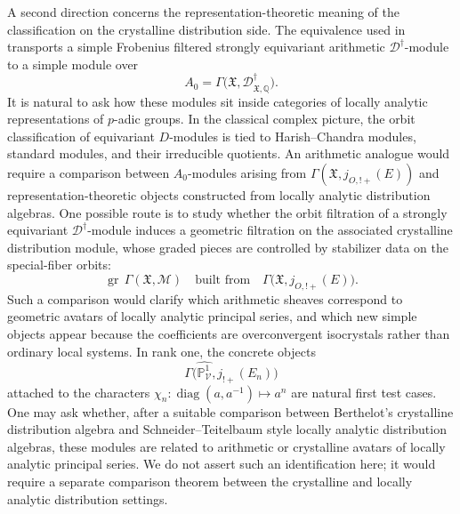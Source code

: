\documentclass[11pt]{amsart}
\theoremstyle{plain}
\theoremstyle{definition}
\theoremstyle{remark}
\begin{document}
A second direction concerns the representation-theoretic meaning of the
classification on the crystalline distribution side.  The equivalence used in
 transports a simple Frobenius filtered strongly equivariant arithmetic
\(\mathscr D^\dagger\)-module to a simple module over
\[
  A_0=
  \Gamma\bigl(\mathfrak X,
  \mathscr D^\dagger_{\mathfrak X,\mathbb Q}\bigr).
\]
It is natural to ask how these modules sit inside categories of locally
analytic representations of \(p\)-adic groups.  In the classical complex
picture, the orbit classification of equivariant \(D\)-modules is tied to
Harish--Chandra modules, standard modules, and their irreducible quotients.
An arithmetic analogue would require a comparison between
\(A_0\)-modules arising from
\(\Gamma(\mathfrak X,j_{O,!+}(E))\) and representation-theoretic objects
constructed from locally analytic distribution algebras.  One possible route is
to study whether the orbit filtration of a strongly equivariant
\(\mathscr D^\dagger\)-module induces a geometric filtration on the associated
crystalline distribution module, whose graded pieces are controlled by
stabilizer data on the special-fiber orbits:
\[
  \operatorname{gr}\,
  \Gamma(\mathfrak X,\mathcal M)
  \quad\text{built from}\quad
  \Gamma\bigl(\mathfrak X,j_{O,!+}(E)\bigr).
\]
Such a comparison would clarify which arithmetic sheaves correspond to
geometric avatars of locally analytic principal series, and which new simple
objects appear because the coefficients are overconvergent isocrystals rather
than ordinary local systems.  In rank one, the concrete objects
\[
  \Gamma\bigl(\widehat{\mathbb P^1_{\mathcal V}},j_{!+}(E_n)\bigr)
\]
attached to the characters \(\chi_n:\operatorname{diag}(a,a^{-1})\mapsto a^n\)
are natural first test cases.  One may ask whether, after a suitable comparison
between Berthelot's crystalline distribution algebra and Schneider--Teitelbaum
style locally analytic distribution algebras, these modules are related to
arithmetic or crystalline avatars of locally analytic principal series.  We do
not assert such an identification here; it would require a separate comparison
theorem between the crystalline and locally analytic distribution settings.
\end{document}
